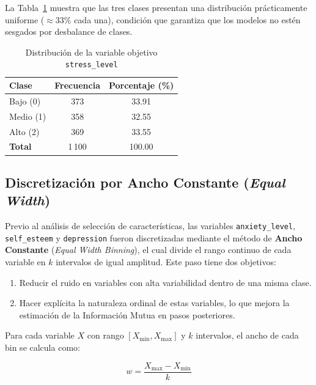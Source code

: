 \documentclass[12pt, letterpaper]{article}
\begin{document}
La Tabla~\ref{tab:distribucion} muestra que las tres clases presentan una
distribución prácticamente uniforme ($\approx\!33\%$ cada una), condición
que garantiza que los modelos no estén sesgados por desbalance de clases.

\begin{table}[H]
    \centering
    \caption{Distribución de la variable objetivo \texttt{stress\_level}}
    \label{tab:distribucion}
    \begin{tabular}{lcc}
        \toprule
        \textbf{Clase} & \textbf{Frecuencia} & \textbf{Porcentaje (\%)} \\
        \midrule
        \rowcolor{rowgray} Bajo (0)  & 373 & 33.91 \\
                           Medio (1) & 358 & 32.55 \\
        \rowcolor{rowgray} Alto (2)  & 369 & 33.55 \\
        \midrule
        \textbf{Total} & 1\,100 & 100.00 \\
        \bottomrule
    \end{tabular}
\end{table}

\subsection{Discretización por Ancho Constante (\textit{Equal Width})}

Previo al análisis de selección de características, las variables
\texttt{anxiety\_level}, \texttt{self\_esteem} y \texttt{depression} fueron
discretizadas mediante el método de \textbf{Ancho Constante} (\textit{Equal
Width Binning}), el cual divide el rango continuo de cada variable en $k$
intervalos de igual amplitud. Este paso tiene dos objetivos:

\begin{enumerate}
    \item Reducir el ruido en variables con alta variabilidad dentro de una
          misma clase.
    \item Hacer explícita la naturaleza ordinal de estas variables, lo que
          mejora la estimación de la Información Mutua en pasos posteriores.
\end{enumerate}

Para cada variable $X$ con rango $[X_{\min}, X_{\max}]$ y $k$ intervalos,
el ancho de cada bin se calcula como:

\begin{equation}
    w = \frac{X_{\max} - X_{\min}}{k}
\end{equation}
\end{document}
